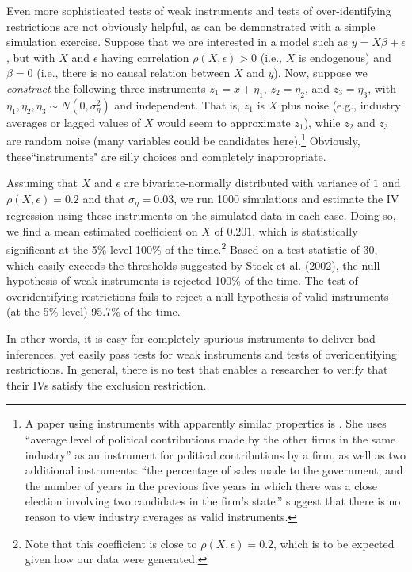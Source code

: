 \documentclass[11pt,reqno]{amsart}
\begin{document}
Even more sophisticated tests of weak instruments and tests of over-identifying restrictions are not obviously helpful, as can be demonstrated with a simple simulation exercise.
Suppose that we are interested in a model such as $y = X \beta + \epsilon$, but with $X$ and $\epsilon$ having correlation $\rho(X, \epsilon) > 0$ (i.e., $X$ is endogenous) and $\beta = 0$ (i.e., there is no causal relation between $X$ and $y$). 
Now, suppose we \emph{construct} the following three instruments 
$z_1 = x +\eta_1$, $z_2 = \eta_2$, and $z_3 = \eta_3$, with $\eta_1, \eta_2,  \eta_3 \sim N(0, \sigma_{\eta}^2)$ and independent. 
That is, $z_1$ is $X$ plus noise (e.g., industry averages or lagged values of $X$ would seem to approximate $z_1$), while $z_2$ and $z_3$ are random noise (many variables could be candidates here).\footnote{A paper using instruments with apparently similar properties is \citet{Correia:2014fp}. 
She uses ``average level of political contributions made by the other firms in the same industry'' as an instrument for political contributions by a firm, as well as two additional instruments: ``the percentage of sales made to the government, and the number of years in the previous five years in which there was a close election involving two candidates in the firm's state.''  \citet{Reiss:2007ej} suggest that there is no reason to view industry averages as valid instruments.}
Obviously, these``instruments" are silly choices and completely inappropriate.

Assuming that $X$ and $\epsilon$ are bivariate-normally distributed with variance of $1$ and $\rho(X, \epsilon)=0.2$ and that $\sigma_{\eta}=0.03$, we run 1000 simulations and  estimate the IV regression using these instruments on the simulated data in each case.
Doing so, we find a mean estimated coefficient on $X$ of $0.201$, which is statistically significant at the 5\% level 100\% of the time.\footnote{Note that this coefficient is close to $\rho(X, \epsilon) = 0.2$, which is to be expected given how our data were generated.} Based on a test statistic of 30, which easily exceeds the thresholds suggested by Stock et al. (2002), the null hypothesis of weak instruments is rejected 100\% of the time. 
The test of overidentifying restrictions fails to reject a null hypothesis of valid instruments (at the 5\% level) 95.7\% of the time.

In other words, it is easy for completely spurious instruments to deliver bad inferences, yet easily pass tests for weak instruments and tests of overidentifying restrictions.
In general, there is no test that enables a researcher to verify that their IVs satisfy the exclusion restriction.
\end{document}
